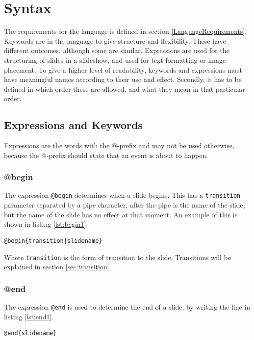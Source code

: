 \chapter{Syntax}
\label{SSyntax}

The requirements for the language is defined in section \ref{LanguageRequirements}. Keywords are in the language to give structure and flexibility. These have different outcomes, although some are similar. Expressions are used for the structuring of slides in a slideshow, and used for text formatting or image placement. To give a higher level of readability, keywords and expressions must have meaningful names according to their use and effect. Secondly, it has to be defined in which order these are allowed, and what they mean in that particular order.

\section{Expressions and Keywords}
Expressions are the words with the @-prefix and may not be used otherwise, because the @-prefix should state that an event is about to happen.

\subsection{@begin}
\label{@begin}
The expression \lstinline!@begin! determines when a slide begins. This has a \texttt{transition} parameter separated by a pipe character, after the pipe is the name of the slide, but the name of the slide has no effect at that moment. An example of this is shown in listing \ref{lst:begin1}.
\begin{lstlisting}[frame=single, caption=Generic \texttt{begin} expression example, label=lst:begin1]
@begin{transition|slidename}
\end{lstlisting}
Where \texttt{transition} is the form of transition to the slide. Transitions will be explained in section \ref{sec:transition}
\newpage
\subsection{@end}
\label{@end}
The expression \lstinline!@end! is used to determine the end of a slide, by writing the line in listing \ref{lst:end1}.
\begin{lstlisting}[frame=single, caption=Generic \texttt{end} expression example, label=lst:end1]
@end{slidename}
\end{lstlisting}

